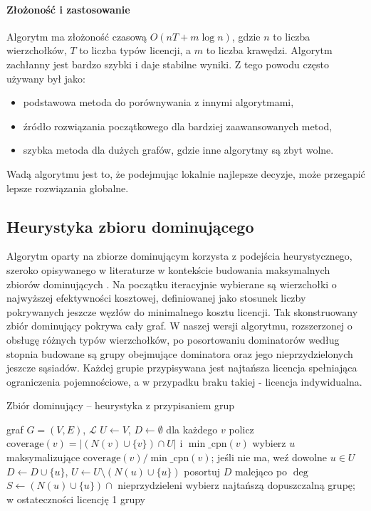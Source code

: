 \paragraph{Złożoność i zastosowanie}
Algorytm ma złożoność czasową $O(nT + m\log n)$, gdzie $n$ to liczba wierzchołków, $T$ to liczba typów licencji, a $m$ to liczba krawędzi.
Algorytm zachłanny jest bardzo szybki i daje stabilne wyniki. Z tego powodu często używany był jako:
\begin{itemize}
  \item podstawowa metoda do porównywania z innymi algorytmami,
  \item źródło rozwiązania początkowego dla bardziej zaawansowanych metod,
  \item szybka metoda dla dużych grafów, gdzie inne algorytmy są zbyt wolne.
\end{itemize}
Wadą algorytmu jest to, że podejmując lokalnie najlepsze decyzje, może przegapić lepsze rozwiązania globalne.

\subsection{Heurystyka zbioru dominującego}\label{subsec:ds}

Algorytm oparty na zbiorze dominującym korzysta z podejścia heurystycznego, szeroko opisywanego w literaturze w kontekście budowania maksymalnych zbiorów dominujących \cite{haynes1998domination}.
Na początku iteracyjnie wybierane są wierzchołki o najwyższej efektywności kosztowej, definiowanej jako stosunek liczby pokrywanych jeszcze węzłów do minimalnego kosztu licencji.
Tak skonstruowany zbiór dominujący pokrywa cały graf.
W naszej wersji algorytmu, rozszerzonej o obsługę różnych typów wierzchołków, po posortowaniu dominatorów według stopnia budowane są grupy obejmujące dominatora oraz jego nieprzydzielonych jeszcze sąsiadów.
Każdej grupie przypisywana jest najtańsza licencja spełniająca ograniczenia pojemnościowe, a w przypadku braku takiej - licencja indywidualna.

\begin{algorithm}[H]
  \caption{Zbiór dominujący -- heurystyka z przypisaniem grup}
  \label{alg:ds}
  \begin{algorithmic}[1]
    \Require graf $G=(V,E)$, $\mathcal{L}$
    \State $U\gets V$, $D\gets\emptyset$
    \State dla każdego $v$ policz $\mathrm{coverage}(v)=|(N(v)\cup\{v\})\cap U|$ i $\min\_\mathrm{cpn}(v)$
    \State wybierz $u$ maksymalizujące $\mathrm{coverage}(v)/\min\_\mathrm{cpn}(v)$; jeśli nie ma, weź dowolne $u\in U$
    \State $D\gets D\cup\{u\}$, $U\gets U\setminus(N(u)\cup\{u\})$
    \EndWhile
    \State posortuj $D$ malejąco po $\deg$
    \State $S\gets(N(u)\cup\{u\})\cap$ nieprzydzieleni
    \State wybierz najtańszą dopuszczalną grupę; w ostateczności licencję 1
    \EndFor
    \State \Return grupy
  \end{algorithmic}
\end{algorithm}

